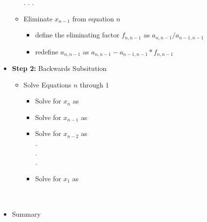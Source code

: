 \documentclass[11pt]{article}
\begin{document}
\begin{description}
\begin{itemize}
\begin{itemize}
\begin{itemize}
				\end{itemize}	
				. . . 
				\renewcommand\labelitemiii{\textperiodcentered}
				\item   Eliminate $x_{n-1}$ from equation $n$ 

					\begin{itemize}
						\item define the eliminating factor $f_{n,n-1}$ as $a_{n,n-1}/a_{n-1,n-1}$
						\item redefine $a_{n,n-1}$ as $a_{n,n-1}-a_{n-1,n-1}*f_{n,n-1}$\
						
					\end{itemize}
				
			\end{itemize}
			\newpage
		\item {\bf Step 2:} Backwards Subsitution
		 \renewcommand\labelitemi{\textbullet}
 		\renewcommand\labelitemii{\textendash}
 		\renewcommand\labelitemiii{\textasteriskcentered}
 		\renewcommand\labelitemiv{\textperiodcentered}
		\begin{itemize}
			\item Solve Equations $n$ through $1$ \\
				\begin{itemize}
				\item Solve for $x_n$ as \\
			
				\item Solve for $x_{n-1}$ as  \\
					
				\item Solve for $x_{n-2}$ as \\
					. \\ .\\ . \\					 
				\item Solve for $x_{1}$ as \\	\\\\
							
				\end{itemize}
		\end{itemize}
		\item Summary \\


\end{itemize}
\end{description}
\end{document}
